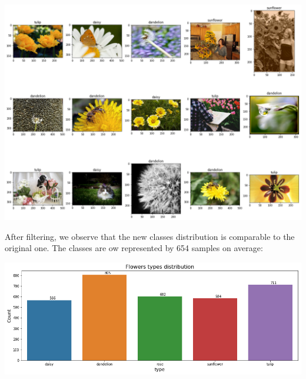 \begin{center}
	\includegraphics[scale=.35]{./sections/03_methodology/output_11_1.png}
\end{center}

%	
%
%
%
%
%

After filtering, we observe that the  new classes distribution is comparable to the original one. The classes are ow represented by 654 samples on average:

\begin{flushleft}
	\includegraphics[scale=.5]{./sections/03_methodology/output_13_0.png}
\end{flushleft}

